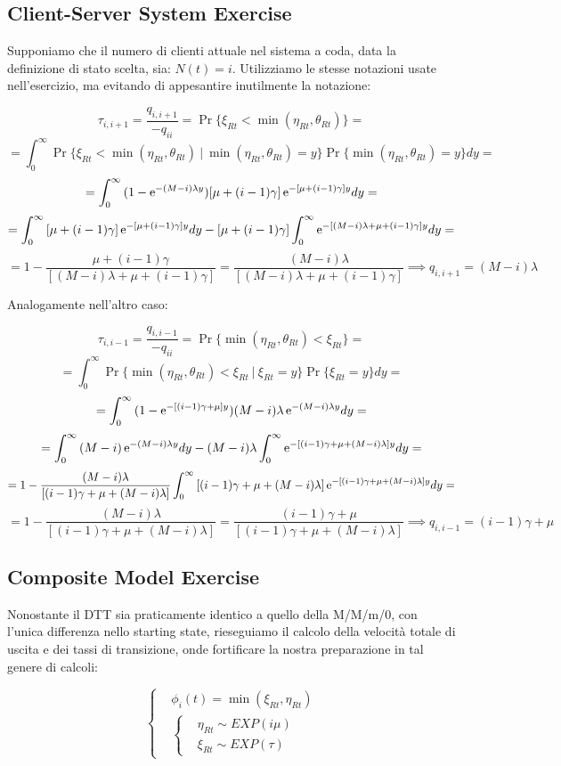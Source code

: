 \subsection{Client-Server System Exercise}

Supponiamo che il numero di clienti attuale nel sistema a coda, data la definizione di stato scelta, sia: $N(t)=i$. Utilizziamo le stesse notazioni usate nell'esercizio, ma evitando di appesantire inutilmente la notazione:

\[
	\tau_{i,i+1} = \frac{q_{i,i+1}}{-q_{ii}} = \Pr\{\xi_{Rt}<\min(\eta_{Rt},\theta_{Rt})\} =
\]
\[
	= \int_0^\infty{\Pr\{\xi_{Rt} < \min(\eta_{Rt},\theta_{Rt})\ |\ \min(\eta_{Rt},\theta_{Rt})=y\}\Pr\{\min(\eta_{Rt},\theta_{Rt})=y\}dy} =
\]
\[
	= \int_0^\infty{(1-\mathop{}\!\mathrm{e}^{-(M-i)\lambda y})[\mu+(i-1)\gamma]\mathop{}\!\mathrm{e}^{-[\mu+(i-1)\gamma]y}dy} =
\]
\[
	= \int_0^\infty{[\mu+(i-1)\gamma]\mathop{}\!\mathrm{e}^{-[\mu+(i-1)\gamma]y}dy} - [\mu+(i-1)\gamma]\int_0^\infty{\mathop{}\!\mathrm{e}^{-[(M-i)\lambda+\mu+(i-1)\gamma]y}dy} =
\]
\[
	= 1-\frac{\mu+(i-1)\gamma}{[(M-i)\lambda + \mu+(i-1)\gamma]} = \frac{(M-i)\lambda}{[(M-i)\lambda+\mu+(i-1)\gamma]} \implies q_{i,i+1} = (M-i)\lambda
\]

Analogamente nell'altro caso:

\[
	\tau_{i,i-1} = \frac{q_{i,i-1}}{-q_{ii}} = \Pr\{\min(\eta_{Rt},\theta_{Rt}) < \xi_{Rt}\} =
\]
\[
	= \int_0^\infty{\Pr\{\min(\eta_{Rt},\theta_{Rt}) < \xi_{Rt}\ |\ \xi_{Rt}=y\}\Pr\{\xi_{Rt}=y\}dy} =
\]
\[
	= \int_0^\infty{(1-\mathop{}\!\mathrm{e}^{-[(i-1)\gamma+\mu]y})(M-i)\lambda\mathop{}\!\mathrm{e}^{-(M-i)\lambda y}dy} =
\]
\[
	=  \int_0^\infty{(M-i)\mathop{}\!\mathrm{e}^{-(M-i)\lambda y}dy} - (M-i)\lambda\int_0^\infty{\mathop{}\!\mathrm{e}^{-[(i-1)\gamma+\mu+(M-i)\lambda]y}dy} =
\]
\[
	= 1-\frac{(M-i)\lambda}{[(i-1)\gamma+\mu+(M-i)\lambda]}\int_0^\infty{[(i-1)\gamma + \mu + (M-i)\lambda]\mathop{}\!\mathrm{e}^{-[(i-1)\gamma + \mu + (M-i)\lambda]y}dy} =
\]
\[
	= 1-\frac{(M-i)\lambda}{[(i-1)\gamma + \mu + (M-i)\lambda]} = \frac{(i-1)\gamma + \mu}{[(i-1)\gamma + \mu + (M-i)\lambda]} \implies q_{i,i-1} = (i-1)\gamma+\mu 
\]

\subsection{Composite Model Exercise}

Nonostante il DTT sia praticamente identico a quello della M/M/m/0, con l'unica differenza nello starting state, rieseguiamo il calcolo della velocità totale di uscita e dei tassi di transizione, onde fortificare la nostra preparazione in tal genere di calcoli:

\[
	\left\{
	\begin{aligned}
	&\phi_i(t)=\min(\xi_{Rt},\eta_{Rt})\\
	&\left\{
	\begin{aligned}
	&\eta_{Rt}\sim EXP(i\mu)\\
	&\xi_{Rt}\sim EXP(\tau)
	\end{aligned}
	\right.
	\end{aligned}
	\right.
\]

